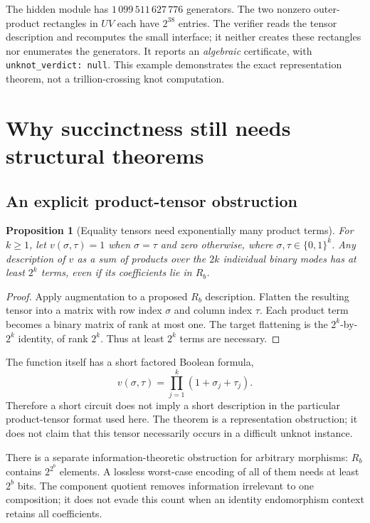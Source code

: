 \documentclass[11pt]{article}
\newtheorem{proposition}[theorem]{Proposition}
\theoremstyle{definition}\newtheorem{definition}[theorem]{Definition}
\theoremstyle{remark}\newtheorem{remark}[theorem]{Remark}
\newcommand{\code}[1]{\texttt{#1}}
\begin{document}
The hidden module has $1\,099\,511\,627\,776$ generators. The two nonzero outer-product rectangles in $UV$ each have $2^{38}$ entries. The verifier reads the tensor description and recomputes the small interface; it neither creates these rectangles nor enumerates the generators. It reports an \emph{algebraic} certificate, with \code{unknot\_verdict: null}. This example demonstrates the exact representation theorem, not a trillion-crossing knot computation.

\section{Why succinctness still needs structural theorems}
\label{sec:obstructions}
\subsection{An explicit product-tensor obstruction}
\begin{proposition}[Equality tensors need exponentially many product terms]\label{prop:tensorrank}
For $k\geq1$, let $v(\sigma,\tau)=1$ when $\sigma=\tau$ and zero otherwise, where $\sigma,\tau\in\{0,1\}^k$. Any description of $v$ as a sum of products over the $2k$ individual binary modes has at least $2^k$ terms, even if its coefficients lie in $R_b$.
\end{proposition}
\begin{proof}
Apply augmentation to a proposed $R_b$ description. Flatten the resulting tensor into a matrix with row index $\sigma$ and column index $\tau$. Each product term becomes a binary matrix of rank at most one. The target flattening is the $2^k$-by-$2^k$ identity, of rank $2^k$. Thus at least $2^k$ terms are necessary.
\end{proof}
The function itself has a short factored Boolean formula,
\[
 v(\sigma,\tau)=\prod_{j=1}^k(1+\sigma_j+\tau_j).
\]
Therefore a short circuit does not imply a short description in the particular product-tensor format used here. The theorem is a representation obstruction; it does not claim that this tensor necessarily occurs in a difficult unknot instance.

There is a separate information-theoretic obstruction for arbitrary morphisms: $R_b$ contains $2^{2^b}$ elements. A lossless worst-case encoding of all of them needs at least $2^b$ bits. The component quotient removes information irrelevant to one composition; it does not evade this count when an identity endomorphism context retains all coefficients.
\end{document}
